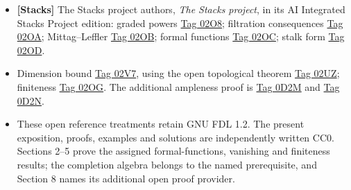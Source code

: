 \documentclass[11pt]{article}
\providecommand{\tightlist}{\setlength{\itemsep}{0pt}\setlength{\parskip}{0pt}}
\begin{document}
\begin{itemize}
\tightlist
\item
  \textbf{{[}Stacks{]}} The Stacks project authors, \emph{The Stacks
  project}, in its AI Integrated Stacks Project edition: graded powers
  \href{https://kokunoyumeto.github.io/stacks-zh-hans-cn/en/coherent.html\#coherent-lemma-cohomology-powers-ideal-times-F}{Tag
  02O8}; filtration consequences
  \href{https://kokunoyumeto.github.io/stacks-zh-hans-cn/en/coherent.html\#coherent-lemma-cohomology-powers-ideal-application}{Tag
  02OA}; Mittag--Leffler
  \href{https://kokunoyumeto.github.io/stacks-zh-hans-cn/en/coherent.html\#coherent-lemma-ML-cohomology-powers-ideal}{Tag
  02OB}; formal functions
  \href{https://kokunoyumeto.github.io/stacks-zh-hans-cn/en/coherent.html\#coherent-theorem-formal-functions}{Tag
  02OC}; stalk form
  \href{https://kokunoyumeto.github.io/stacks-zh-hans-cn/en/coherent.html\#coherent-lemma-formal-functions-stalk}{Tag
  02OD}.
\item
  Dimension bound
  \href{https://kokunoyumeto.github.io/stacks-zh-hans-cn/en/coherent.html\#coherent-lemma-higher-direct-images-zero-above-dimension-fibre}{Tag
  02V7}, using the open topological theorem
  \href{https://kokunoyumeto.github.io/stacks-zh-hans-cn/en/cohomology.html\#cohomology-proposition-vanishing-Noetherian}{Tag
  02UZ}; finiteness
  \href{https://kokunoyumeto.github.io/stacks-zh-hans-cn/en/coherent.html\#coherent-lemma-characterize-finite}{Tag
  02OG}. The additional ampleness proof is
  \href{https://kokunoyumeto.github.io/stacks-zh-hans-cn/en/coherent.html\#coherent-lemma-ample-on-fibre}{Tag
  0D2M} and
  \href{https://kokunoyumeto.github.io/stacks-zh-hans-cn/en/coherent.html\#coherent-lemma-ample-in-neighbourhood}{Tag
  0D2N}.
\item
  These open reference treatments retain GNU FDL 1.2. The present
  exposition, proofs, examples and solutions are independently written
  CC0. Sections 2--5 prove the assigned formal-functions, vanishing and
  finiteness results; the completion algebra belongs to the named
  prerequisite, and Section 8 names its additional open proof provider.
\end{itemize}
\end{document}
